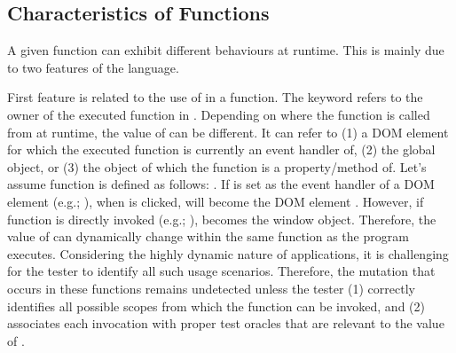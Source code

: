 \subsection{Characteristics of \javascript Functions} A given \javascript function can exhibit different behaviours at runtime. This is mainly due to two features of the \javascript language. 


First feature is related to the use of  in a function. The  keyword refers to the owner of the executed function in \javascript. Depending on where the function is called from at runtime, the value of  can be different. It can refer to (1) a DOM element for which the executed function is currently an event handler of, (2) the global  object, or (3) the object of which the function is a property/method of. Let's assume function  is defined as follows: . If  is set as the event handler of a DOM element  (e.g.; ), when  is clicked,  will become the DOM element . However, if function  is directly invoked (e.g.; ),  becomes the window object. Therefore, the value of  can dynamically change within the same function as the program executes. Considering the highly dynamic nature of \javascript applications, it is challenging for the tester to identify all such usage scenarios. Therefore, the mutation that occurs in these functions remains undetected unless the tester (1) correctly identifies all possible scopes from which the function can be invoked, and (2) associates each invocation with proper test oracles that are relevant to the value of .     

